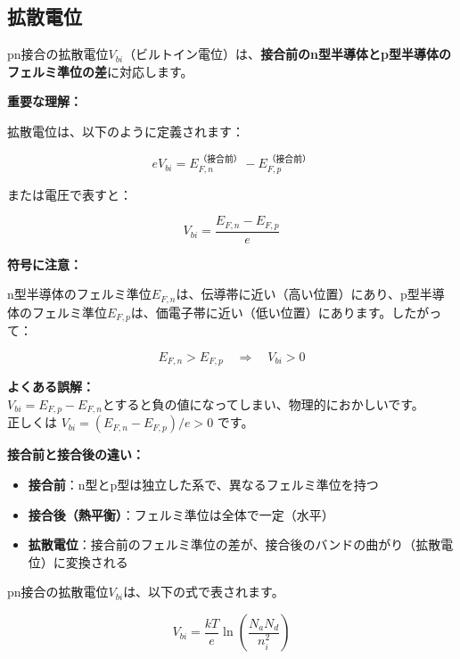 \subsection{拡散電位}

pn接合の拡散電位$V_{bi}$（ビルトイン電位）は、\textbf{接合前のn型半導体とp型半導体のフェルミ準位の差}に対応します。

\textbf{重要な理解：}

拡散電位は、以下のように定義されます：

\begin{equation}
eV_{bi} = E_{F,n}^{\text{（接合前）}} - E_{F,p}^{\text{（接合前）}}
\end{equation}

または電圧で表すと：

\begin{equation}
V_{bi} = \frac{E_{F,n} - E_{F,p}}{e}
\end{equation}

\textbf{符号に注意：}

n型半導体のフェルミ準位$E_{F,n}$は、伝導帯に近い（高い位置）にあり、p型半導体のフェルミ準位$E_{F,p}$は、価電子帯に近い（低い位置）にあります。したがって：

\begin{equation}
E_{F,n} > E_{F,p} \quad \Rightarrow \quad V_{bi} > 0
\end{equation}

\begin{screen}
\textbf{よくある誤解：}\\
$V_{bi} = E_{F,p} - E_{F,n}$とすると負の値になってしまい、物理的におかしいです。\\
正しくは $V_{bi} = (E_{F,n} - E_{F,p})/e > 0$ です。
\end{screen}

\textbf{接合前と接合後の違い：}

\begin{itemize}
\item \textbf{接合前}：n型とp型は独立した系で、異なるフェルミ準位を持つ
\item \textbf{接合後（熱平衡）}：フェルミ準位は全体で一定（水平）
\item \textbf{拡散電位}：接合前のフェルミ準位の差が、接合後のバンドの曲がり（拡散電位）に変換される
\end{itemize}

pn接合の拡散電位$V_{bi}$は、以下の式で表されます。

\begin{equation}
V_{bi} = \frac{kT}{e} \ln\left(\frac{N_a N_d}{n_i^2}\right)
\end{equation}

